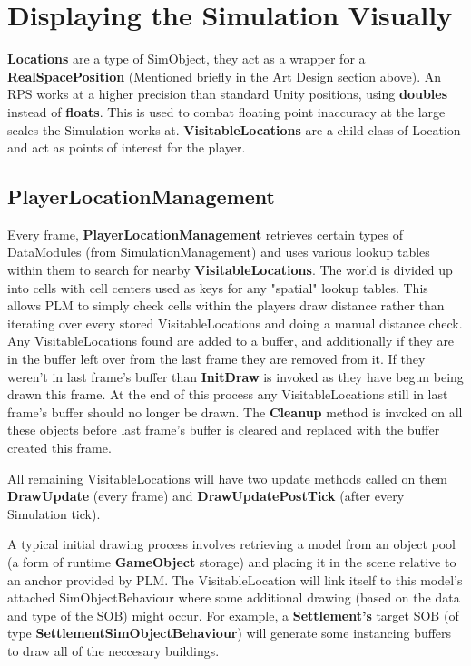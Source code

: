 \documentclass{report}
\begin{document}
\section{Displaying the Simulation Visually}

\textbf{Locations} are a type of SimObject, they act as a wrapper for a \textbf{RealSpacePosition} (Mentioned briefly in the Art Design section above). An RPS works at a higher precision than standard Unity positions, using \textbf{doubles} instead of \textbf{floats}. This is used to combat floating point inaccuracy at the large scales the Simulation works at. \textbf{VisitableLocations} are a child class of Location and act as points of interest for the player.

\subsection{PlayerLocationManagement}

Every frame, \textbf{PlayerLocationManagement} retrieves certain types of DataModules (from SimulationManagement) and uses various lookup tables within them to search for nearby \textbf{VisitableLocations}. The world is divided up into cells with cell centers used as keys for any "spatial" lookup tables. This allows PLM to simply check cells within the players  draw distance rather than iterating over every stored VisitableLocations and doing a manual distance check. Any VisitableLocations found are added to a buffer, and additionally if they are in the buffer left over from the last frame they are removed from it. If they weren't in last frame's buffer than \textbf{InitDraw} is invoked as they have begun being drawn this frame.
At the end of this process any VisitableLocations still in last frame's buffer should no longer be drawn. The \textbf{Cleanup} method is invoked on all these objects before last frame's buffer is cleared and replaced with the buffer created this frame. 

All remaining VisitableLocations will have two update methods called on them \textbf{DrawUpdate} (every frame) and \textbf{DrawUpdatePostTick} (after every Simulation tick).

A typical initial drawing process involves retrieving a model from an object pool (a form of runtime \textbf{GameObject} storage) and placing it in the scene relative to an anchor provided by PLM. The VisitableLocation will link itself to this model's attached SimObjectBehaviour where some additional drawing (based on the data and type of the SOB) might occur. For example, a \textbf{Settlement's} target SOB (of type \textbf{SettlementSimObjectBehaviour}) will generate some instancing buffers to draw all of the neccesary buildings.
\end{document}
